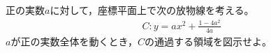 \documentclass[../../main.tex]{subfiles}
\begin{document}
正の実数$a$に対して，座標平面上で次の放物線を考える。
\begin{align*}
  C: y=ax^2+\frac{1-4a^2}{4a}
\end{align*}
$a$が正の実数全体を動くとき，$C$の通過する領域を図示せよ。
\end{document}
